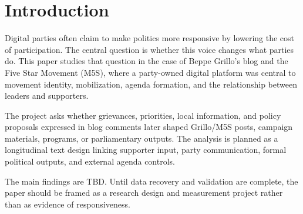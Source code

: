 \section{Introduction}\label{sec:introduction}

Digital parties often claim to make politics more responsive by lowering the cost of participation. The central question is whether this voice changes what parties do. This paper studies that question in the case of Beppe Grillo's blog and the Five Star Movement (M5S), where a party-owned digital platform was central to movement identity, mobilization, agenda formation, and the relationship between leaders and supporters.

The project asks whether grievances, priorities, local information, and policy proposals expressed in blog comments later shaped Grillo/M5S posts, campaign materials, programs, or parliamentary outputs. The analysis is planned as a longitudinal text design linking supporter input, party communication, formal political outputs, and external agenda controls.

The main findings are TBD. Until data recovery and validation are complete, the paper should be framed as a research design and measurement project rather than as evidence of responsiveness.
